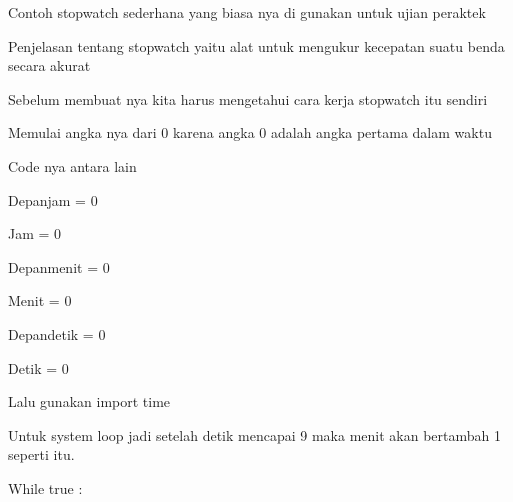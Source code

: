 \documentclass[a4paper,12pt]{report}
\begin{document}
{\fontsize{14pt}{14pt}\selectfont Contoh stopwatch sederhana yang biasa nya di gunakan untuk ujian peraktek  \\} \par
\vspace{14pt}
\noindent 
{\fontsize{14pt}{14pt}\selectfont Penjelasan tentang stopwatch yaitu alat untuk mengukur kecepatan suatu benda secara akurat \\} \par
\vspace{14pt}
\noindent 
{\fontsize{14pt}{14pt}\selectfont Sebelum membuat nya kita harus mengetahui cara kerja stopwatch itu sendiri  \\} \par
\vspace{14pt}
\noindent 
{\fontsize{14pt}{14pt}\selectfont Memulai angka nya dari 0 karena angka 0 adalah angka pertama dalam waktu \\} \par
\noindent 
{\fontsize{14pt}{14pt}\selectfont Code nya antara lain \\} \par
\vspace{14pt}
\noindent 
{\fontsize{14pt}{14pt}\selectfont Depanjam = 0 \\} \par
\noindent 
{\fontsize{14pt}{14pt}\selectfont Jam = 0 \\} \par
\noindent 
{\fontsize{14pt}{14pt}\selectfont Depanmenit = 0 \\} \par
\noindent 
{\fontsize{14pt}{14pt}\selectfont Menit = 0 \\} \par
\noindent 
{\fontsize{14pt}{14pt}\selectfont Depandetik = 0 \\} \par
\noindent 
{\fontsize{14pt}{14pt}\selectfont Detik = 0 \\} \par
\noindent 
{\fontsize{14pt}{14pt}\selectfont  Lalu gunakan import time \\} \par
\noindent 
{\fontsize{14pt}{14pt}\selectfont Untuk system loop jadi setelah detik mencapai 9 maka menit akan bertambah 1 seperti itu. \\} \par
\vspace{14pt}
\noindent 
{\fontsize{14pt}{14pt}\selectfont While true : \\} \par
\end{document}
